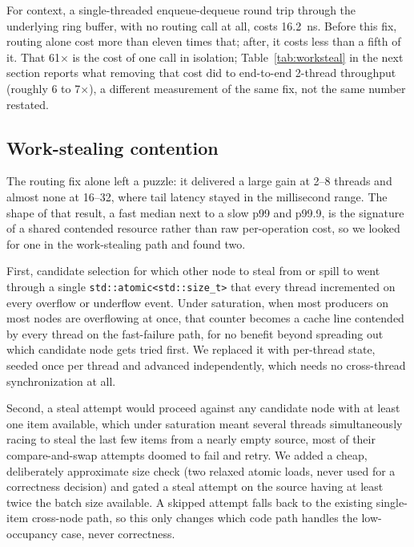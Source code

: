 \documentclass[10pt,journal,compsoc]{IEEEtran}
\begin{document}
For context, a single-threaded enqueue-dequeue round trip through the underlying ring buffer, with
no routing call at all, costs \SI{16.2}{\nano\second}. Before this fix, routing alone cost more
than eleven times that; after, it costs less than a fifth of it. That 61$\times$ is the cost of one
call in isolation; Table~\ref{tab:worksteal} in the next section reports what removing that cost
did to end-to-end 2-thread throughput (roughly 6 to 7$\times$), a different measurement of the same
fix, not the same number restated.

\subsection{Work-stealing contention}
\label{sec:eval-worksteal}

The routing fix alone left a puzzle: it delivered a large gain at 2--8 threads and almost none at
16--32, where tail latency stayed in the millisecond range. The shape of that result, a fast median
next to a slow p99 and p99.9, is the signature of a shared contended resource rather than raw
per-operation cost, so we looked for one in the work-stealing path and found two.

First, candidate selection for which other node to steal from or spill to went through a single
\texttt{std::atomic<std::size\_t>} that every thread incremented on every overflow or underflow
event. Under saturation, when most producers on most nodes are overflowing at once, that counter
becomes a cache line contended by every thread on the fast-failure path, for no benefit beyond
spreading out which candidate node gets tried first. We replaced it with per-thread state, seeded
once per thread and advanced independently, which needs no cross-thread synchronization at all.

Second, a steal attempt would proceed against any candidate node with at least one item available,
which under saturation meant several threads simultaneously racing to steal the last few items from
a nearly empty source, most of their compare-and-swap attempts doomed to fail and retry. We added a
cheap, deliberately approximate size check (two relaxed atomic loads, never used for a correctness
decision) and gated a steal attempt on the source having at least twice the batch size available. A
skipped attempt falls back to the existing single-item cross-node path, so this only changes which
code path handles the low-occupancy case, never correctness.
\end{document}
